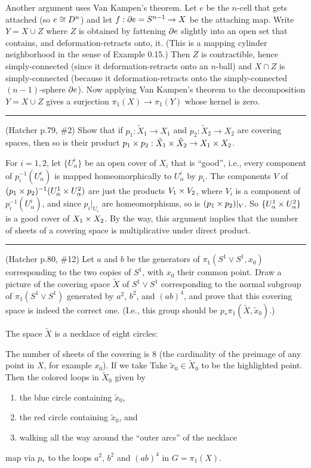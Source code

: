 Another argument uses Van Kampen's theorem.
Let $e$ be the $n$-cell that gets attached
(so $e\cong D^n$) and let $f:\partial e=S^{n-1}\to X$ be the attaching map.
Write $Y=X\cup Z$ where $Z$ is obtained by fattening $\partial e$ slightly
into an open set that contains,
and deformation-retracts onto, it.  (This is a mapping cylinder neighborhood
in the sense of Example 0.15.)  Then $Z$ is contractible,
hence simply-connected
(since it deformation-retracts onto an $n$-ball)
and $X\cap Z$ is  simply-connected (because it deformation-retracts onto
the simply-connected $(n-1)$-sphere $\partial e$).  Now applying
Van Kampen's
theorem to the decomposition $Y=X\cup Z$
gives a surjection $\pi_1(X)\to\pi_1(Y)$ whose kernel is zero.\\

\vfill\hrule\vfill


\prob (Hatcher p.79, \#2) Show that if $p_1:\tilde X_1\to X_1$ and $p_2:\tilde X_2\to X_2$ are covering spaces, then so is their product $p_1\times p_2:\tilde X_1\times\tilde X_2\to X_1\times X_2$.

\soln For $i=1,2$, let $\{U^i_\alpha\}$ be an open cover of $X_i$ that is ``good'', i.e., every component of $p_i^{-1}(U^i_\alpha)$ is mapped homeomorphically to $U^i_\alpha$ by $p_i$.  The components $V$ of $(p_1\times p_2)^{-1}(U^1_\alpha\times U^2_\alpha)$ are just the products $V_1\times V_2$, where $V_i$ is a component of $p_i^{-1}(U^i_\alpha)$, and since $p_i|_{U_i}$ are homeomorphisms, so is $(p_1\times p_2)|_V$.  So $\{U^1_\alpha\times U^2_\alpha\}$ is a good cover of $X_1\times X_2$.  By the way, this argument implies that the number of sheets of a covering space is multiplicative under direct product.\\

\vfill\hrule\vfill

\prob (Hatcher p.80, \#12) Let $a$ and $b$ be the generators of $\pi_1(S^1\vee S^1,x_0)$ corresponding to the two copies of $S^1$, with $x_0$ their common point.  Draw a picture of the covering space $\tilde X$ of $S^1\vee S^1$ corresponding to the normal subgroup of $\pi_1(S^1\vee S^1)$ generated by $a^2$, $b^2$, and $(ab)^4$, and prove that this covering space is indeed the correct one.  (I.e., this group should be $p_*\pi_1(\tilde X,\tilde x_0)$.) 

\soln The space $\tilde X$ is a necklace of eight circles:


The number of sheets of the covering is 8 (the cardinality of the preimage of any point in $X$, for example $x_0$).  If we take
Take $\tilde x_0\in \tilde X_0$ to be the highlighted point.  Then the colored loops in $\tilde X_0$ given by
\begin{enumerate}
\item the blue circle containing $\tilde x_0$, 
\item the red circle containing $\tilde x_0$, and
\item walking all the way around the ``outer arcs'' of the necklace
\end{enumerate}
map via $p_*$ to the loops $a^2$, $b^2$ and $(ab)^4$ in $G=\pi_1(X)$.

